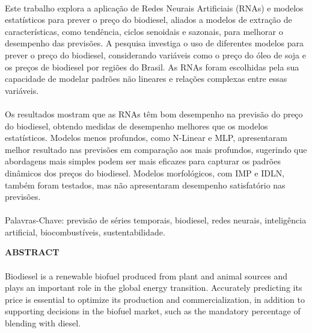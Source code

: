 \paragraph{} Este trabalho explora a aplicação de Redes Neurais Artificiais (\acsp{RNA}) e modelos estatísticos para prever o preço do biodiesel, aliados a modelos de extração de características, como tendência, ciclos senoidais e sazonais, para melhorar o desempenho das previsões. A pesquisa investiga o uso de diferentes modelos para prever o preço do biodiesel, considerando variáveis como o preço do óleo de soja e os preços de biodiesel por regiões do Brasil. As \acsp{RNA} foram escolhidas pela sua capacidade de modelar padrões não lineares e relações complexas entre essas variáveis.

\paragraph{} Os resultados mostram que as \acsp{RNA} têm bom desempenho na previsão do preço do biodiesel, obtendo medidas de desempenho melhores que os modelos estatísticos. Modelos menos profundos, como \acf{N-Linear} e \acf{MLP}, apresentaram melhor resultado nas previsões em comparação aos mais profundos, sugerindo que abordagens mais simples podem ser mais eficazes para capturar os padrões dinâmicos dos preços do biodiesel. Modelos morfológicos, com \acf{IMP} e \acf{IDLN}, também foram testados, mas não apresentaram desempenho satisfatório nas previsões.
\paragraph{}
\noindent Palavras-Chave: previsão de séries temporais, biodiesel, redes neurais, inteligência artificial, biocombustíveis, sustentabilidade.

\pagebreak


\begin{center}
	\textbf{ABSTRACT}
\end{center}
\vspace{0.5cm}

\paragraph{} Biodiesel is a renewable biofuel produced from plant and animal sources and plays an important role in the global energy transition. Accurately predicting its price is essential to optimize its production and commercialization, in addition to supporting decisions in the biofuel market, such as the mandatory percentage of blending with diesel.

